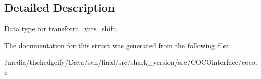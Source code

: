 \subsection{Detailed Description}
Data type for transform\+\_\+vars\+\_\+shift. 

The documentation for this struct was generated from the following file\+:\begin{DoxyCompactItemize}
\item 
/media/thehedgeify/\+Data/svn/final/src/shark\+\_\+version/src/\+C\+O\+C\+Ointerface/coco.\+c\end{DoxyCompactItemize}
